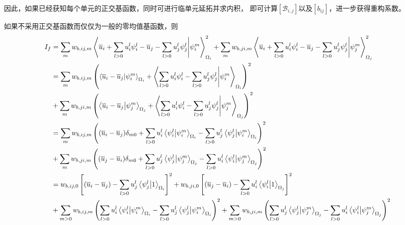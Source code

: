\documentclass[UTF8,zihao=5]{ctexart} %
\newcommand*{\mean}[1]{\overline{#1}}
\begin{document}
因此，如果已经获知每个单元的正交基函数，同时可进行临单元延拓并求内积，
即可计算$[\mathcal{B}_{i,j}]$以及$[b_{ij}]$，进一步获得重构系数。

如果不采用正交基函数而仅仅为一般的零均值基函数，则
$$
    \begin{aligned}
        I_f & =
        \sum_{m}
        {
            w_{b,ij,m}
            \innerproduct{\mean{u}_i + \sum_{l>0}{u_i^l\psi_i^l} - \mean{u}_j - \sum_{l>0}{u_j^l\psi_j^l} }{\psi_i^m}_{\Omega_i}^2
        }
        +
        \sum_{m}
        {
            w_{b,ji,m}
            \innerproduct{\mean{u}_i + \sum_{l>0}{u_i^l\psi_i^l} - \mean{u}_j - \sum_{l>0}{u_j^l\psi_j^l} }{\psi_j^m}_{\Omega_j}^2
        }          \\
            & =
        \sum_{m}
        {w_{b,ij,m}\left(
            \innerproduct{\mean{u}_i - \mean{u}_j}{\psi_i^m}_{\Omega_i}
            +
            \innerproduct{\sum_{l>0}{u_i^l\psi_i^l} - \sum_{l>0}{u_j^l\psi_j^l} }{\psi_i^m}_{\Omega_i}
            \right)^2}
        \\
            & +
        \sum_{m}
        {w_{b,ji,m}\left(
            \innerproduct{\mean{u}_i - \mean{u}_j}{\psi_j^m}_{\Omega_j}
            +
            \innerproduct{\sum_{l>0}{u_i^l\psi_i^l} - \sum_{l>0}{u_j^l\psi_j^l} }{\psi_j^m}_{\Omega_j}
        \right)^2} \\
            & =
        \sum_{m}
        {w_{b,ij,m}\left(
            (\mean{u}_i - \mean{u}_j)\delta_{m0}
            +
            \sum_{l>0}u_i^l\innerproduct{\psi_i^l}{\psi_i^m}_{\Omega_i}
            - \sum_{l>0}u_j^l\innerproduct{\psi_j^l}{\psi_i^m}_{\Omega_i}
            \right)^2}
        \\
            & +
        \sum_{m}
        {w_{b,ji,m}\left(
            (\mean{u}_j - \mean{u}_i)\delta_{m0}
            +
            \sum_{l>0}u_j^l\innerproduct{\psi_j^l}{\psi_j^m}_{\Omega_j}
            - \sum_{l>0}u_i^l\innerproduct{\psi_i^l}{\psi_j^m}_{\Omega_j}
        \right)^2} \\
            & =
        w_{b,ij,0}\left[
            (\mean{u}_i - \mean{u}_j)
            - \sum_{l>0}u_j^l\innerproduct{\psi_j^l}{1}_{\Omega_i}
            \right]^2
        +
        w_{b,ji,0}\left[
            (\mean{u}_j - \mean{u}_i)
            - \sum_{l>0}u_i^l\innerproduct{\psi_i^l}{1}_{\Omega_j}
        \right]^2  \\
            & +
        \sum_{m>0}
        {w_{b,ij,m}\left(
            \sum_{l>0}u_i^l\innerproduct{\psi_i^l}{\psi_i^m}_{\Omega_i}
            - \sum_{l>0}u_j^l\innerproduct{\psi_j^l}{\psi_i^m}_{\Omega_i}
            \right)^2}
        +
        \sum_{m>0}
        {w_{b,ji,m}\left(
            \sum_{l>0}u_j^l\innerproduct{\psi_j^l}{\psi_j^m}_{\Omega_j}
            - \sum_{l>0}u_i^l\innerproduct{\psi_i^l}{\psi_j^m}_{\Omega_j}
        \right)^2} \\
    \end{aligned}
$$
\end{document}

